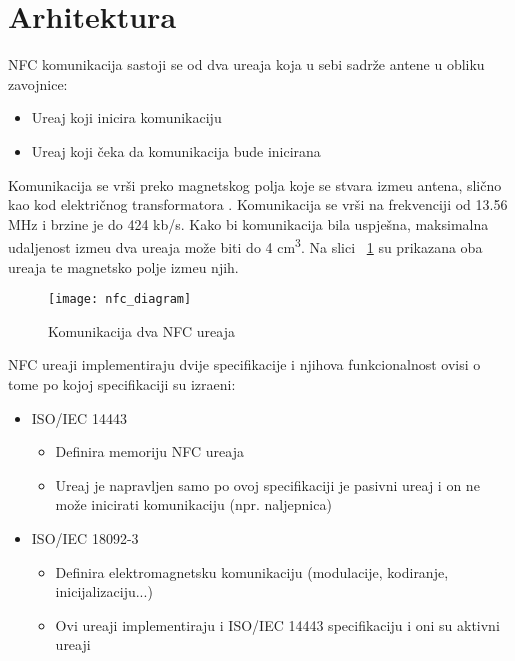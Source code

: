 \section{Arhitektura}

NFC komunikacija sastoji se od dva ure\dj aja koja u sebi sadr\v{z}e antene u obliku zavojnice:
\begin{itemize}
	\item Ure\dj aj koji inicira komunikaciju
	\item Ure\dj aj koji \v{c}eka da komunikacija bude inicirana
\end{itemize}

Komunikacija se vr\v{s}i preko magnetskog polja koje se stvara izme\dj u antena, sli\v{c}no kao kod elektri\v{c}nog transformatora \cite{nfc_techonology}. Komunikacija se vr\v{s}i na frekvenciji od 13.56 MHz i brzine je do 424 kb/s. Kako bi komunikacija bila uspje\v{s}na, maksimalna udaljenost izme\dj u dva ure\dj aja mo\v{z}e biti do 4 cm\textsuperscript{3}. Na slici ~\ref{fig:nfc_arhitektura} su prikazana oba ure\dj aja te magnetsko polje izme\dj u njih.


\begin{figure}[!htbp]
	\begin{center}
 \texttt{[image: nfc\_diagram]}
 \caption{Komunikacija dva NFC ure\dj aja}
 \label{fig:nfc_arhitektura}
	\end{center}
\end{figure}

NFC ure\dj aji implementiraju dvije specifikacije i njihova funkcionalnost ovisi o tome po kojoj specifikaciji su izra\dj eni:

\begin{itemize}
	\item ISO/IEC 14443
	\begin{itemize}
		\item Definira memoriju NFC ure\dj aja
		\item Ure\dj aj je napravljen samo po ovoj specifikaciji je pasivni ure\dj aj i on ne mo\v{z}e inicirati komunikaciju (npr. naljepnica)
		
	\end{itemize}
	\item ISO/IEC 18092-3
	
	\begin{itemize}
		\item Definira elektromagnetsku komunikaciju (modulacije, kodiranje, inicijalizaciju...)
		\item Ovi ure\dj aji implementiraju i ISO/IEC 14443 specifikaciju i oni su aktivni ure\dj aji
	\end{itemize}
\end{itemize}

